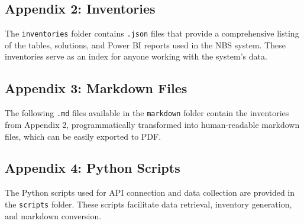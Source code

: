 \subsection{Appendix 2: Inventories}
The \texttt{inventories} folder contains \texttt{.json} files that provide a comprehensive listing of the tables, solutions, and Power BI reports used in the NBS system. These inventories serve as an index for anyone working with the system’s data.


\subsection{Appendix 3: Markdown Files}
The following \texttt{.md} files available in the \texttt{markdown} folder contain the inventories from Appendix 2, programmatically transformed into human-readable markdown files, which can be easily exported to PDF.


\subsection{Appendix 4: Python Scripts}
The Python scripts used for API connection and data collection are provided in the \texttt{scripts} folder. These scripts facilitate data retrieval, inventory generation, and markdown conversion.

